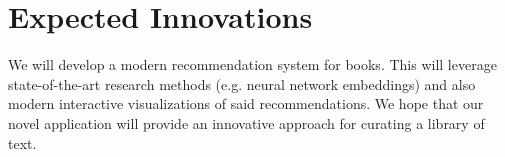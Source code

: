 
\section{Expected Innovations}

We will develop a modern recommendation system for books. This will leverage state-of-the-art research methods (e.g. neural network embeddings) and also modern interactive visualizations of said recommendations. We hope that our novel application will provide an innovative approach for curating a library of text.